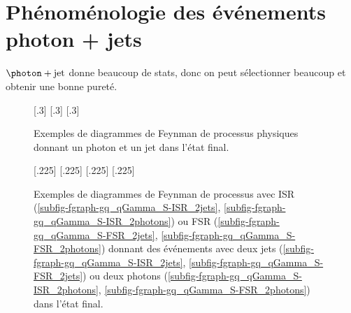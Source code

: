 \section{Phénoménologie des événements photon + jets}\label{chapter-JERC-section-pheno-GJets}
$\photon+\text{jet}$ donne beaucoup de stats, donc on peut sélectionner beaucoup et obtenir une bonne pureté.
\begin{figure}[h]
\centering\vspace{\baselineskip}
\subcaptionbox{\label{subfig-fgraph-gq_qGamma_S}}[.3\textwidth]
{\vspace{\baselineskip}}
\hfill
\subcaptionbox{\label{subfig-fgraph-gq_qGamma_T}}[.3\textwidth]
{\vspace{\baselineskip}}
\hfill
\subcaptionbox{\label{subfig-fgraph-qq_gGamma}}[.3\textwidth]
{\vspace{\baselineskip}}
\caption{Exemples de diagrammes de Feynman de processus physiques donnant un photon et un jet dans l'état final.}
\label{fig-fgraph-gamma_plus_jets}
\end{figure}

\begin{figure}[h]
\centering\vspace{\baselineskip}
\subcaptionbox{\label{subfig-fgraph-gq_qGamma_S-ISR_2jets}}[.225\textwidth]
{\vspace{\baselineskip}}
\hfill
\subcaptionbox{\label{subfig-fgraph-gq_qGamma_S-ISR_2photons}}[.225\textwidth]
{\vspace{\baselineskip}}
\hfill
\subcaptionbox{\label{subfig-fgraph-gq_qGamma_S-FSR_2jets}}[.225\textwidth]
{\vspace{\baselineskip}}
\hfill
\subcaptionbox{\label{subfig-fgraph-gq_qGamma_S-FSR_2photons}}[.225\textwidth]
{\vspace{\baselineskip}}
\caption{Exemples de diagrammes de Feynman de processus avec ISR (\ref{subfig-fgraph-gq_qGamma_S-ISR_2jets}, \ref{subfig-fgraph-gq_qGamma_S-ISR_2photons}) ou FSR (\ref{subfig-fgraph-gq_qGamma_S-FSR_2jets}, \ref{subfig-fgraph-gq_qGamma_S-FSR_2photons}) donnant des événements avec deux jets (\ref{subfig-fgraph-gq_qGamma_S-ISR_2jets}, \ref{subfig-fgraph-gq_qGamma_S-FSR_2jets}) ou deux photons (\ref{subfig-fgraph-gq_qGamma_S-ISR_2photons}, \ref{subfig-fgraph-gq_qGamma_S-FSR_2photons}) dans l'état final.}
\label{fig-fgraph-gamma_plus_jets-ISR-FSR}
\end{figure}

